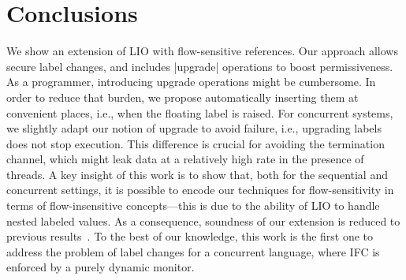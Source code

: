 \section{Conclusions}

We show an extension of LIO with flow-sensitive references. Our approach allows
secure label changes, and includes |upgrade| operations to boost
permissiveness. As a programmer, introducing upgrade operations might be
cumbersome. In order to reduce that burden, we propose automatically inserting
them at convenient places, i.e., when the floating label is raised. For
concurrent systems, we slightly adapt our notion of upgrade to avoid failure,
i.e., upgrading labels does not stop execution. This difference is crucial for
avoiding the termination channel, which might leak data at a relatively high
rate in the presence of threads. A key insight of this work is to show that,
both for the sequential and concurrent settings, it is possible to encode our
techniques for flow-sensitivity in terms of flow-insensitive concepts---this is
due to the ability of LIO to handle nested labeled values. As a consequence,
soundness of our extension is reduced to previous
results~\cite{stefan:lio,stefan:addressing-covert}. To the best of our
knowledge, this work is the first one to address the problem of label changes
for a concurrent language, where IFC is enforced by a purely dynamic monitor.

